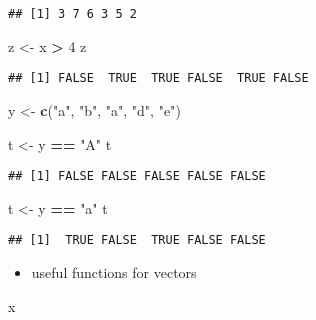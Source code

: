 \documentclass[
  a4paper,
]{article}
\newenvironment{Shaded}{\begin{snugshade}}{\end{snugshade}}
\newcommand{\DecValTok}[1]{\textcolor[rgb]{0.00,0.00,0.81}{#1}}
\newcommand{\FunctionTok}[1]{\textcolor[rgb]{0.13,0.29,0.53}{\textbf{#1}}}
\newcommand{\NormalTok}[1]{#1}
\newcommand{\OtherTok}[1]{\textcolor[rgb]{0.56,0.35,0.01}{#1}}
\newcommand{\SpecialCharTok}[1]{\textcolor[rgb]{0.81,0.36,0.00}{\textbf{#1}}}
\newcommand{\StringTok}[1]{\textcolor[rgb]{0.31,0.60,0.02}{#1}}
\providecommand{\tightlist}{%
  \setlength{\itemsep}{0pt}\setlength{\parskip}{0pt}}
\begin{document}
\begin{verbatim}
## [1] 3 7 6 3 5 2
\end{verbatim}

\begin{Shaded}
\begin{Highlighting}[]
\NormalTok{z }\OtherTok{\textless{}{-}}\NormalTok{ x }\SpecialCharTok{\textgreater{}} \DecValTok{4}
\NormalTok{z}
\end{Highlighting}
\end{Shaded}

\begin{verbatim}
## [1] FALSE  TRUE  TRUE FALSE  TRUE FALSE
\end{verbatim}

\begin{Shaded}
\begin{Highlighting}[]
\NormalTok{y }\OtherTok{\textless{}{-}} \FunctionTok{c}\NormalTok{(}\StringTok{"a"}\NormalTok{, }\StringTok{"b"}\NormalTok{, }\StringTok{"a"}\NormalTok{, }\StringTok{"d"}\NormalTok{, }\StringTok{"e"}\NormalTok{)}

\NormalTok{t }\OtherTok{\textless{}{-}}\NormalTok{ y }\SpecialCharTok{==} \StringTok{"A"}
\NormalTok{t}
\end{Highlighting}
\end{Shaded}

\begin{verbatim}
## [1] FALSE FALSE FALSE FALSE FALSE
\end{verbatim}

\begin{Shaded}
\begin{Highlighting}[]
\NormalTok{t }\OtherTok{\textless{}{-}}\NormalTok{ y }\SpecialCharTok{==} \StringTok{"a"}
\NormalTok{t}
\end{Highlighting}
\end{Shaded}

\begin{verbatim}
## [1]  TRUE FALSE  TRUE FALSE FALSE
\end{verbatim}

\begin{itemize}
\tightlist
\item
  useful functions for vectors
\end{itemize}

\begin{Shaded}
\begin{Highlighting}[]
\NormalTok{x}
\end{Highlighting}
\end{Shaded}
\end{document}
